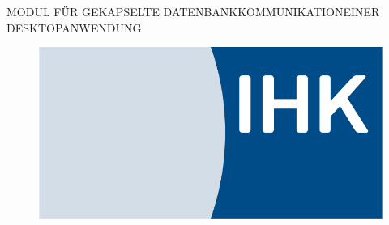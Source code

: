 \documentclass[11pt,toc=sectionentrywithoutdots, 
headheight=44pt, headings=optiontoheadandtoc, hyperfootnotes=false, hypertexnames=false]{scrartcl}
\newcommand\sectionRefs{%
	\sectiontitle  
}
\begin{document}



\setlength{\parindent}{0em} %
\setlength{\parskip}{0em} %

\thispagestyle{empty}

\cfoot[]{}
\ofoot{\thepage}



\ihead
{%
	\begin{small}
	
	
		MODUL FÜR GEKAPSELTE DATENBANKKOMMUNIKATION\newline EINER DESKTOPANWENDUNG%
		\newline\
		\textit\sectionRefs
	\end{small}%
}
\begin{figure}[h]
\includegraphics[scale=0.25]{ihkLogo}
\centering
\end{figure}
\end{document}
